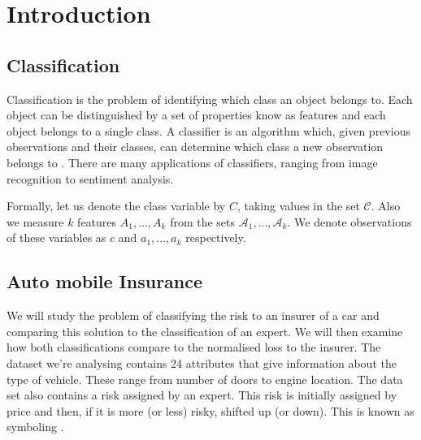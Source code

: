 \chapter{Introduction}

\section{Classification}

Classification is the problem of identifying which class an object belongs to. Each object can be distinguished by a set of properties know as features and each object belongs to a single class. A classifier is an algorithm which, given previous observations and their classes, can determine which class a new observation belongs to \cite{Theodoridis03}. There are many applications of classifiers, ranging from image recognition to sentiment analysis.

Formally, let us denote the class variable by $C$, taking values in the set $\mathcal{C}$. Also we measure $k$ features $A_1,\dots,A_k$ from the sets $\mathcal{A}_1,\dots,\mathcal{A}_k$. We denote observations of these variables as $c$ and $a_1,\dots,a_k$ respectively.

\section{Auto mobile Insurance}

We will study the problem of classifying the risk to an insurer of a car and comparing this solution to the classification of an expert. We will then examine how both classifications compare to the normalised loss to the insurer. The dataset we're analysing contains 24 attributes that give information about the type of vehicle. These range from number of doors to engine location. The data set also contains a risk assigned by an expert. This risk is initially assigned by price and then, if it is more (or less) risky, shifted up (or down). This is known as symboling \cite{Automobile}.



	
